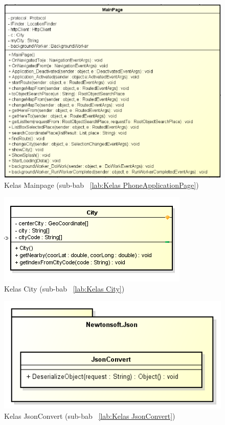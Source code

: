 \begin{figure}[h!]
	\centering
		\includegraphics[scale=0.6]{Gambar/useCase_dan_Class/perClass/main}
	\caption{Kelas Mainpage (sub-bab ~\ref{lab:Kelas PhoneApplicationPage})}
	\label{fig:kelasMainpage}
\end{figure}

\begin{figure}[h!]
	\centering
		\includegraphics[scale=0.7]{Gambar/useCase_dan_Class/perClass/city}
	\caption{Kelas City (sub-bab ~\ref{lab:Kelas City})}
	\label{fig:kelasCity}
\end{figure}

\begin{figure}[h!]
	\centering
		\includegraphics[scale=0.7]{Gambar/useCase_dan_Class/perClass/jsonConvert}
	\caption{Kelas JsonConvert (sub-bab ~\ref{lab:Kelas JsonConvert})}
	\label{fig:kelasJsonConvert}
\end{figure}

